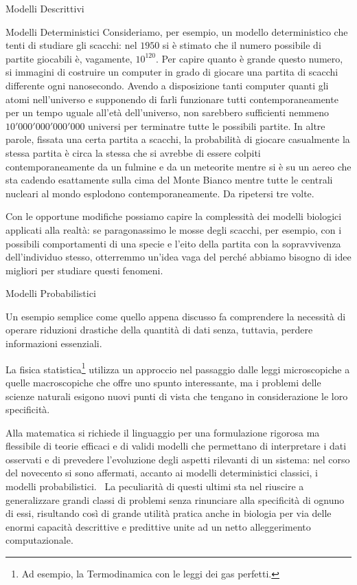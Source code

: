 \documentclass{article}
\begin{document}
\begin{section}{Modelli Descrittivi}
\begin{subsection}{Modelli Deterministici}
			Consideriamo, per esempio, un modello deterministico che tenti di studiare gli scacchi: nel $1950$ si è stimato che il numero possibile di partite giocabili è, vagamente, $10^{120}$.
			Per capire quanto è grande questo numero, si immagini di costruire un computer in grado di giocare una partita di scacchi differente ogni nanosecondo. Avendo a disposizione tanti computer quanti gli atomi nell'universo e supponendo di farli funzionare tutti contemporaneamente per un tempo uguale all'età dell'universo, non sarebbero sufficienti nemmeno $10'000'000'000'000$ universi per terminatre tutte le possibili partite.
			In altre parole, fissata una certa partita a scacchi, la probabilità di giocare casualmente la stessa partita è circa la stessa che si avrebbe di essere colpiti contemporaneamente da un fulmine e da un meteorite mentre si è su un aereo che sta cadendo esattamente sulla cima del Monte Bianco mentre tutte le centrali nucleari al mondo esplodono contemporaneamente. Da ripetersi tre volte.
			
			Con le opportune modifiche possiamo capire la complessità dei modelli biologici applicati alla realtà: se paragonassimo le mosse degli scacchi, per esempio, con i possibili comportamenti di una specie e l'eito della partita con la sopravvivenza dell'individuo stesso, otterremmo un'idea vaga del perché abbiamo bisogno di idee migliori per studiare questi fenomeni.
			
		\end{subsection}
	
		\begin{subsection}{Modelli Probabilistici}
			
			Un esempio semplice come quello appena discusso fa comprendere la necessità di operare riduzioni drastiche della quantità di dati senza, tuttavia, perdere informazioni essenziali. 
			
			La fisica statistica\footnote{Ad esempio, la Termodinamica con le leggi dei gas perfetti.} utilizza un approccio nel passaggio dalle leggi microscopiche a quelle macroscopiche che offre uno spunto interessante, ma i problemi delle scienze naturali esigono nuovi punti di vista che tengano in considerazione le loro specificità.
			
			Alla matematica si richiede il linguaggio per una formulazione rigorosa ma flessibile di teorie efficaci e di validi modelli che permettano di interpretare i dati osservati e di prevedere l’evoluzione degli aspetti rilevanti di un sistema: nel corso del novecento si sono affermati, accanto ai modelli deterministici classici, i modelli probabilistici. 
			La peculiarità di questi ultimi sta nel riuscire a generalizzare grandi classi di problemi senza rinunciare alla specificità di ognuno di essi, risultando così di grande utilità pratica anche in biologia per via delle enormi capacità descrittive e predittive unite ad un netto alleggerimento computazionale.
			

\end{subsection}
\end{section}
\end{document}
